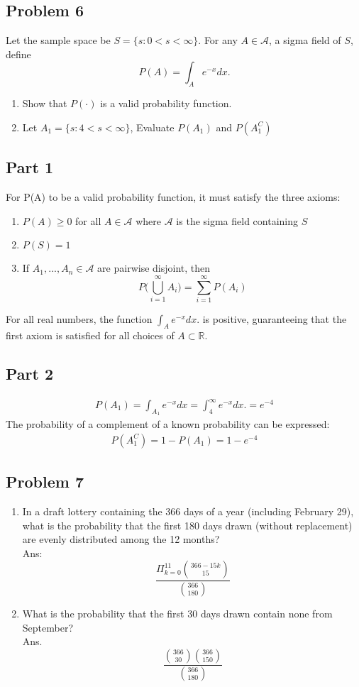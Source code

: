 \documentclass{article}
\begin{document}
\clearpage
\subsection*{Problem 6}
    Let the sample space be $S = \{s: 0<s<\infty\}$. For any $A \in \mathcal{A}$, a sigma field of $S$, define
    \[
    P(A) = \int_{A}e^{-x}dx.
    \]
    \begin{enumerate}
    \item
      Show that $P(\cdot)$ is a valid probability function. 
    \item
      Let $A_1=\{s:4<s<\infty\}$, Evaluate $P(A_1)$ and $P(A_{1}^{C})$ 
    \end{enumerate}
\subsection*{Part 1}
For P(A) to be a valid probability function, it must satisfy the three axioms:
\begin{enumerate}
\item
$P(A) \geq 0$ for all $A\in \mathcal{A}$ where $\mathcal{A}$ is the sigma field containing $S$
\item
$P(S) = 1$
\item
If $A_1,..., A_n \in \mathcal{A}$ are pairwise disjoint, then \[
    P\Bigg( \bigcup_{i=1}^{\infty}A_i \Bigg) = \sum_{i=1}^{\infty} P(A_i)\]
\end{enumerate}

For all real numbers, the function $\int_{A}e^{-x}dx.$ is positive, guaranteeing that the first axiom is satisfied for all choices of $A\subset \mathbb{R}$.
\subsection*{Part 2}
\begin{align*}
P(A_1) = \int_{A_1}e^{-x}dx = \int_{4}^{\infty} e^{-x}dx. = \boxed{e^{-4}}
\end{align*}
The probability of a complement of a known probability can be expressed:
\begin{align*}
\boxed{P(A_1^C) = 1-P(A_1) = 1 - e^{-4}}
\end{align*}

    
\clearpage
\subsection*{Problem 7}
    \begin{enumerate}
    \item
      In a draft lottery containing the 366 days of a year (including February 29), what is the probability that the first 180 days drawn (without replacement) are evenly distributed among the 12 months?\\
      Ans:
      \[
      \frac{\Pi_{k=0}^{11}\genfrac(){0pt}{2}{366-15k}{15}}{\genfrac(){0pt}{2}{366}{180}}
        \]
    \item
      What is the probability that the first 30 days drawn contain none from September?\\
      Ans.
      \[
      \frac{\genfrac(){0pt}{2}{366}{30}\genfrac(){0pt}{2}{366}{150}}{\genfrac(){0pt}{2}{366}{180}}
      \]
    \end{enumerate}
\end{document}
